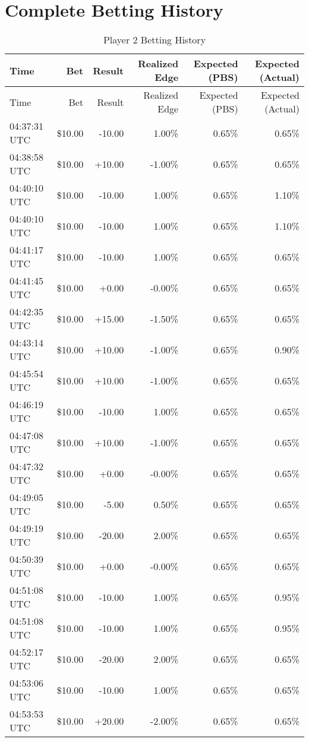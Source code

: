 \documentclass[11pt]{article}
\begin{document}
\section*{Complete Betting History}
\begin{longtable}{l | r | r | r | r | r}
\caption{Player 2 Betting History}\label{tab:history_p2}\\
\hline
Time & Bet & Result & Realized Edge & Expected (PBS) & Expected (Actual) \\ \hline
\endfirsthead
\hline
Time & Bet & Result & Realized Edge & Expected (PBS) & Expected (Actual) \\ \hline
\endhead
04:37:31 UTC & \$10.00 & -10.00 & 1.00\% & 0.65\% & 0.65\% \\
04:38:58 UTC & \$10.00 & +10.00 & -1.00\% & 0.65\% & 0.65\% \\
04:40:10 UTC & \$10.00 & -10.00 & 1.00\% & 0.65\% & 1.10\% \\
04:40:10 UTC & \$10.00 & -10.00 & 1.00\% & 0.65\% & 1.10\% \\
04:41:17 UTC & \$10.00 & -10.00 & 1.00\% & 0.65\% & 0.65\% \\
04:41:45 UTC & \$10.00 & +0.00 & -0.00\% & 0.65\% & 0.65\% \\
04:42:35 UTC & \$10.00 & +15.00 & -1.50\% & 0.65\% & 0.65\% \\
04:43:14 UTC & \$10.00 & +10.00 & -1.00\% & 0.65\% & 0.90\% \\
04:45:54 UTC & \$10.00 & +10.00 & -1.00\% & 0.65\% & 0.65\% \\
04:46:19 UTC & \$10.00 & -10.00 & 1.00\% & 0.65\% & 0.65\% \\
04:47:08 UTC & \$10.00 & +10.00 & -1.00\% & 0.65\% & 0.65\% \\
04:47:32 UTC & \$10.00 & +0.00 & -0.00\% & 0.65\% & 0.65\% \\
04:49:05 UTC & \$10.00 & -5.00 & 0.50\% & 0.65\% & 0.65\% \\
04:49:19 UTC & \$10.00 & -20.00 & 2.00\% & 0.65\% & 0.65\% \\
04:50:39 UTC & \$10.00 & +0.00 & -0.00\% & 0.65\% & 0.65\% \\
04:51:08 UTC & \$10.00 & -10.00 & 1.00\% & 0.65\% & 0.95\% \\
04:51:08 UTC & \$10.00 & -10.00 & 1.00\% & 0.65\% & 0.95\% \\
04:52:17 UTC & \$10.00 & -20.00 & 2.00\% & 0.65\% & 0.65\% \\
04:53:06 UTC & \$10.00 & -10.00 & 1.00\% & 0.65\% & 0.65\% \\
04:53:53 UTC & \$10.00 & +20.00 & -2.00\% & 0.65\% & 0.65\% \\
\hline
\end{longtable}
\end{document}
